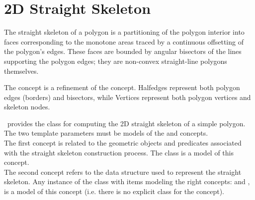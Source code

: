 
\chapter{2D Straight Skeleton}
\label{ref-chapter-straightskeleton2}


The straight skeleton of a polygon is a partitioning of the polygon interior into faces corresponding to the monotone areas traced by a continuous offsetting of the polygon's edges.
These faces are bounded by angular bisectors of the lines supporting the polygon edges; they are non-convex straight-line polygons themselves.

The concept  is a refinement of the  concept.
Halfedges represent both polygon edges (borders) and bisectors, while Vertices represent both polygon vertices and skeleton nodes.

\cgal\ provides the class  for
computing the 2D straight skeleton of a simple polygon.
The two template parameters must be models of the  and  concepts.\\
The first concept is related to the geometric objects and predicates associated with
the straight skeleton construction process. The class  is a model of this concept.\\
The second concept refers to the data structure used to represent the straight skeleton.
Any instance of the class  with items modeling the right concepts:  and , is a model of this concept (i.e. there is no explicit class for the  concept).

 \\
 \\
 \\
 \\

